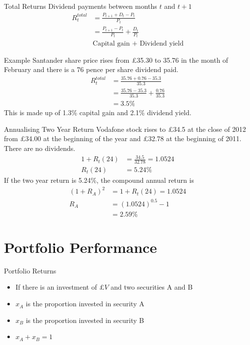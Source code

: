 \documentclass[14pt,xcolor=pdftex,dvipsnames,table]{beamer}
\begin{document}
\begin{frame}{Total Returns}
Dividend payments between months $t$ and $t+1$
\begin{align*}
R_t^{total} &= \frac{P_{t+1} + D_t - P_t}{P_t} \\ 
& = \frac{P_{t+1}-P_t}{P_t} + \frac{D_t}{P_t}\\
& \text{Capital gain + Dividend yield}
\end{align*}
\end{frame}

\begin{frame}{Example}
Santander share price rises from £35.30 to 35.76 in the month of February and there is a 76 pence per share dividend paid.  
\begin{align*}
R_t^{total} &= \frac{35.76+ 0.76 -35.3}{35.3} \\
& = \frac{35.76-35.3}{35.3} + \frac{0.76}{35.3}\\
& = 3.5\%
\end{align*}
This is made up of 1.3\% capital gain and 2.1\% dividend yield. 
\end{frame}

\begin{frame}{Annualising Two Year Return}
Vodafone stock rises to £34.5 at the close of 2012 from £34.00 at the beginning of the year and £32.78 at the beginning of 2011.  There are no dividends. 
\begin{align*}
1+R_t(24) &= \frac{34.5}{32.78} = 1.0524\\
R_t(24) &= 5.24\%
\end{align*}
If the two year return is 5.24\%, the compound annual  return is 
\begin{align*}
(1 + R_A)^2 &= 1 +R_t(24) = 1.0524\\
R_A &= (1.0524)^{0.5} - 1\\
&= 2.59\%
\end{align*}
\end{frame}


\section{Portfolio Performance}
\begin{frame}{Portfolio Returns}
\begin{itemize}
\item If there is an investment of $£V$ and two securities A and B
\item $x_A$ is the proportion invested in security A
\item $x_B$ is the proportion invested in security B
\item $x_A + x_B = 1$
\end{itemize}
\end{frame}
\end{document}
